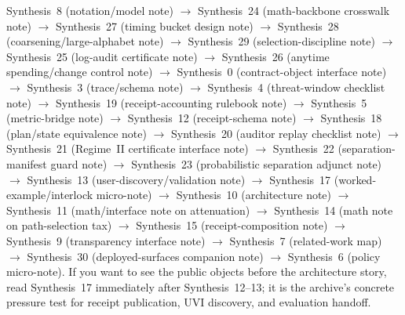 \documentclass[11pt]{article}
\begin{document}
\begin{enumerate}[leftmargin=*]
  Synthesis~8 (notation/model note) $\rightarrow$ Synthesis~24 (math-backbone crosswalk note) $\rightarrow$ Synthesis~27 (timing bucket design note) $\rightarrow$ Synthesis~28 (coarsening/large-alphabet note) $\rightarrow$ Synthesis~29 (selection-discipline note) $\rightarrow$ Synthesis~25 (log-audit certificate note) $\rightarrow$ Synthesis~26 (anytime spending/change control note) $\rightarrow$ Synthesis~0 (contract-object interface note) $\rightarrow$ Synthesis~3 (trace/schema note) $\rightarrow$ Synthesis~4 (threat-window checklist note) $\rightarrow$ Synthesis~19 (receipt-accounting rulebook note) $\rightarrow$ Synthesis~5 (metric-bridge note) $\rightarrow$ Synthesis~12 (receipt-schema note) $\rightarrow$ Synthesis~18 (plan/state equivalence note) $\rightarrow$ Synthesis~20 (auditor replay checklist note) $\rightarrow$ Synthesis~21 (Regime~II certificate interface note) $\rightarrow$ Synthesis~22 (separation-manifest guard note) $\rightarrow$ Synthesis~23 (probabilistic separation adjunct note) $\rightarrow$ Synthesis~13 (user-discovery/validation note) $\rightarrow$ Synthesis~17 (worked-example/interlock micro-note) $\rightarrow$ Synthesis~10 (architecture note) $\rightarrow$ Synthesis~11 (math/interface note on attenuation) $\rightarrow$ Synthesis~14 (math note on path-selection tax) $\rightarrow$ Synthesis~15 (receipt-composition note) $\rightarrow$ Synthesis~9 (transparency interface note) $\rightarrow$ Synthesis~7 (related-work map) $\rightarrow$ Synthesis~30 (deployed-surfaces companion note) $\rightarrow$ Synthesis~6 (policy micro-note).
If you want to see the public objects before the architecture story, read Synthesis~17 immediately after Synthesis~12--13; it is the archive's concrete pressure test for receipt publication, UVI discovery, and evaluation handoff.
\end{enumerate}
\end{document}
